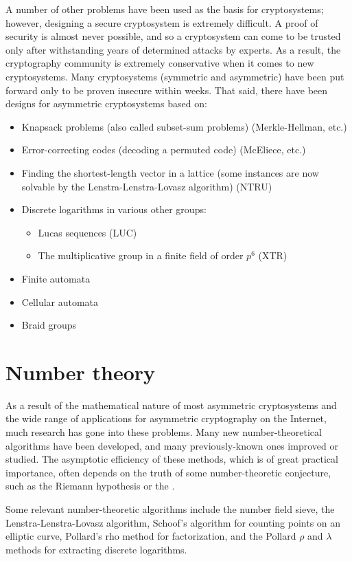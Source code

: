 \documentclass[12pt]{article}
\begin{document}
A number of other problems have been used as the basis for cryptosystems; however, designing a secure cryptosystem is extremely difficult.  A proof of security is almost never possible, and so a cryptosystem can come to be trusted only after withstanding years of determined attacks by experts.  As a result, the cryptography community is extremely conservative when it comes to new cryptosystems.  Many cryptosystems (symmetric and asymmetric) have been put forward only to be proven insecure within weeks.  That said, there have been designs for asymmetric cryptosystems based on:
\begin{itemize}
\item Knapsack problems (also called subset-sum problems) (Merkle-Hellman, etc.)
\item Error-correcting codes (decoding a permuted code) (McEliece, etc.)
\item Finding the shortest-length vector in a lattice (some instances are now solvable by the Lenstra-Lenstra-Lovasz algorithm) (NTRU)
\item Discrete logarithms in various other groups:
\begin{itemize}
\item Lucas sequences (LUC)
\item The multiplicative group in a finite field of order $p^6$ (XTR)
\end{itemize}
\item Finite automata
\item Cellular automata
\item Braid groups
\end{itemize}

\section*{Number theory}

As a result of the mathematical nature of most asymmetric cryptosystems and the wide range of applications for asymmetric cryptography on the Internet, much research has gone into these problems.  
Many new number-theoretical algorithms have been developed, and many previously-known ones improved or studied.  The asymptotic efficiency of these methods, which is of great practical importance, often depends on the truth of some number-theoretic conjecture, such as the Riemann hypothesis or the .

Some relevant number-theoretic algorithms include the number field sieve, the Lenstra-Lenstra-Lovasz algorithm, Schoof's algorithm for counting points on an elliptic curve, Pollard's rho method for factorization, and the Pollard $\rho$ and $\lambda$ methods for extracting discrete logarithms.
\end{document}
